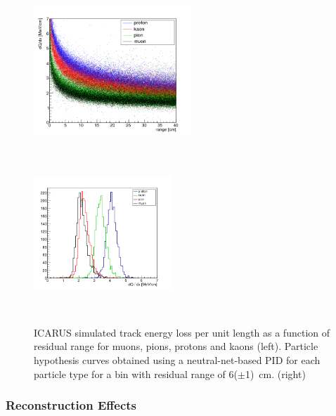 \begin{figure}[h!]
  \centering
\includegraphics[width=0.53\textwidth,height=6.0cm]{figures/pids}
\includegraphics[width=0.46\textwidth,height=6.0cm]{figures/prkpimu}
  \caption{ICARUS simulated track energy loss per unit length as a function of residual 
range for muons, pions, protons and kaons (left). Particle hypothesis curves obtained using a
neutral-net-based PID for each particle type for a bin with residual range of 6($\pm$1)~cm. (right)
}
\label{fig:resrange}
\end{figure}





\subsubsection{Reconstruction Effects}
\label{sec_reco}

